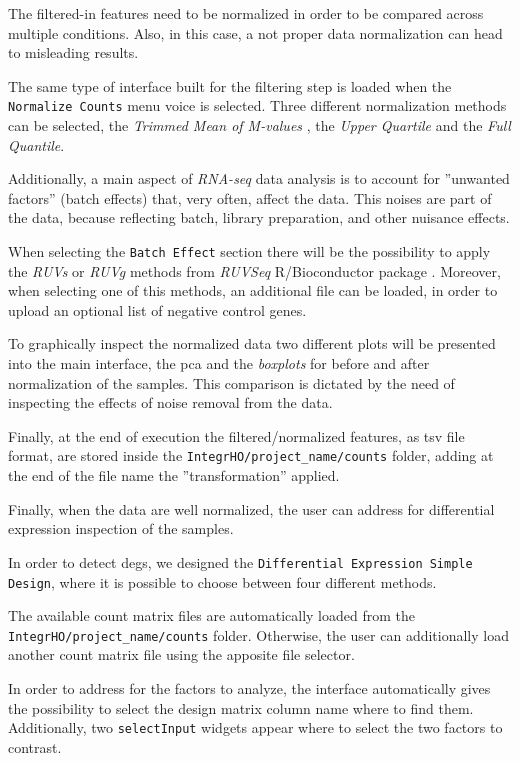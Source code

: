 The filtered-in features need to be normalized in order to be compared across multiple conditions.
Also, in this case, a not proper data normalization can head to misleading results.

The same type of interface built for the filtering step is loaded when the \lstinline!Normalize Counts! menu voice is selected.
Three different normalization methods can be selected, the \textit{Trimmed Mean of M-values} \cite{Robinson2010}, the \textit{Upper Quartile} and the \textit{Full Quantile}.

Additionally, a main aspect of \textit{RNA-seq} data analysis is to account for ''unwanted factors'' (batch effects) that, very often, affect the data.
This noises are part of the data, because reflecting batch, library preparation, and other nuisance effects.

When selecting the \lstinline!Batch Effect! section there will be the possibility to apply the \textit{RUVs} or \textit{RUVg} methods from \textit{RUVSeq} R/Bioconductor package \cite{Risso2014h}.
Moreover, when selecting one of this methods, an additional file can be loaded, in order to upload an optional list of negative control genes.

To graphically inspect the normalized data two different plots will be presented into the main interface, the \gls{pca} and the \textit{boxplots} for before and after normalization of the samples.
This comparison is dictated by the need of inspecting the effects of noise removal from the data.

Finally, at the end of execution the filtered/normalized features, as \gls{tsv} file format, are stored inside the \lstinline!IntegrHO/project_name/counts! folder, adding at the end of the file name the ''transformation'' applied.



Finally, when the data are well normalized, the user can address for differential expression inspection of the samples.

In order to detect \glspl{deg}, we designed the \lstinline!Differential Expression Simple Design!, where it is possible to choose between four different methods.

The available count matrix files are automatically loaded from the \lstinline!IntegrHO/project_name/counts! folder.
Otherwise, the user can additionally load another count matrix file using the apposite file selector.

In order to address for the factors to analyze, the interface automatically gives the possibility to select the design matrix column name where to find them.
Additionally, two \lstinline!selectInput! widgets appear where to select the two factors to contrast.

